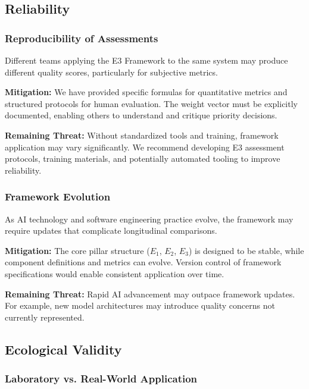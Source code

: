 \subsection{Reliability}

\subsubsection{Reproducibility of Assessments}

Different teams applying the E3 Framework to the same system may produce different quality scores, particularly for subjective metrics.

\textbf{Mitigation:} We have provided specific formulas for quantitative metrics and structured protocols for human evaluation. The weight vector must be explicitly documented, enabling others to understand and critique priority decisions.

\textbf{Remaining Threat:} Without standardized tools and training, framework application may vary significantly. We recommend developing E3 assessment protocols, training materials, and potentially automated tooling to improve reliability.

\subsubsection{Framework Evolution}

As AI technology and software engineering practice evolve, the framework may require updates that complicate longitudinal comparisons.

\textbf{Mitigation:} The core pillar structure ($E_1$, $E_2$, $E_3$) is designed to be stable, while component definitions and metrics can evolve. Version control of framework specifications would enable consistent application over time.

\textbf{Remaining Threat:} Rapid AI advancement may outpace framework updates. For example, new model architectures may introduce quality concerns not currently represented.

\subsection{Ecological Validity}

\subsubsection{Laboratory vs. Real-World Application}

